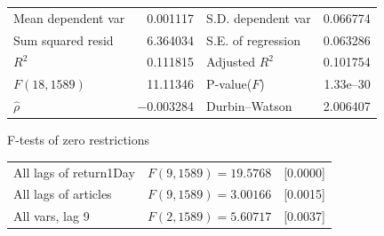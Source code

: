 \begin{center}
\vspace{1ex}
\begin{tabular}{lrlr}
Mean dependent var &  0.001117 & S.D. dependent var &  0.066774 \\
Sum squared resid &  6.364034 & S.E. of regression &  0.063286 \\
$R^2$ &  0.111815 & Adjusted $R^2$ &  0.101754 \\
$F(18, 1589)$ &  11.11346 & P-value($F$) &  1.33\textrm{e--30} \\
$\hat{\rho}$ & $-$0.003284 & Durbin--Watson &  2.006407 \\
\end{tabular}


\end{center}

\begin{center}
F-tests of zero restrictions\\[1em]
\begin{tabular}{lll}
All lags of return1Day & $F(9, 1589) = 19.5768$ & [0.0000]\\
All lags of articles & $F(9, 1589) = 3.00166$ & [0.0015]\\
All vars, lag 9 & $F(2, 1589) = 5.60717$ & [0.0037]\\
\end{tabular}
\end{center}

\clearpage

